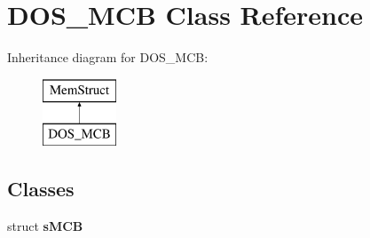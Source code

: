 \hypertarget{classDOS__MCB}{\section{D\-O\-S\-\_\-\-M\-C\-B Class Reference}
\label{classDOS__MCB}
}
Inheritance diagram for D\-O\-S\-\_\-\-M\-C\-B\-:\begin{figure}[H]
\begin{center}
\leavevmode
\includegraphics[height=2.000000cm]{classDOS__MCB}
\end{center}
\end{figure}
\subsection*{Classes}
\begin{DoxyCompactItemize}
\item 
struct {\bfseries s\-M\-C\-B}
\end{DoxyCompactItemize}
